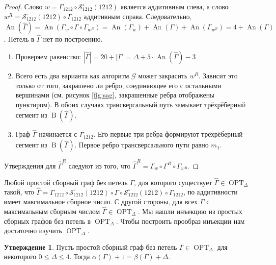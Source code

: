 \documentclass{article}
\theoremstyle{definition}
\newtheorem{conjecture}[theorem]{Утверждение}
\newcommand{\An}{\operatorname{An}}
\newcommand{\G}{\mathcal{G}}
\newcommand{\OPT}{\operatorname{OPT}}
\newcommand{\D}{\Delta}
\newcommand{\hGamma}{\hat{\Gamma}}
\newcommand{\B}{\operatorname{B}}
\begin{document}
\begin{proof}
    Слово $w = \Gamma_{1212} \circ \mathcal{S}_{1212}^\circ(1212)$ является аддитивным слева, а слово $w^R = \mathcal{S}_{1212}^\circ(1212) \circ \Gamma_{1212}$ аддитивным справа. Следовательно, $\An(\hGamma) = \An(\Gamma_w \circ \Gamma \circ \Gamma_{w^R}) = \An(\Gamma_w) + \An(\Gamma) + \An(\Gamma_{w^R}) = 4 + \An(\Gamma)$. Петель в $\hGamma$ нет по построению.
    
    \begin{enumerate}
        \item  Проверяем равенство: $|\hGamma| = 20 + |\Gamma| = \D+ 5 \cdot \An(\hGamma) - 3$
        \item  Всего есть два варианта как алгоритм $\G$ может закрасить $w^R$. Зависит это только от того, закрашено ли ребро, соединяющее его с остальными вершинами (см. рисунок \ref{fig:sag}, закрашенные ребра отображены пунктиром). В обоих случаях трансверсальный путь замыкает трёхрёберный сегмент из $\B(\hGamma)$.
        
        \item  Граф $\hGamma$ начинается с $\Gamma_{1212}$. Его первые три ребра формируют трёхрёберный сегмент из $\B(\hGamma)$. Первое ребро трансверсального пути равно $m_1$.
    \end{enumerate}

    Утверждения для $\hGamma^R$ следуют из того, что $\hGamma^R = \Gamma_w \circ \Gamma^R \circ \Gamma_{w^R}$.
\end{proof}

 Любой простой сборный граф без петель $\Gamma$, для которого существует $\hGamma \in \OPT_\D$ такой, что $\hGamma = \Gamma_{1212} \circ \mathcal{S}_{1212}^\circ(1212) \circ\Gamma \circ \mathcal{S}_{1212}^\circ(1212) \circ \Gamma_{1212}$, по аддитивности имеет максимальное сборное число. С другой стороны, для всех $\Gamma$ с максимальным сборным числом $\hGamma \in \OPT_\D$. Мы нашли инъекцию из простых сборных графов без петель в $\OPT_\D$. Чтобы построить прообраз инъекции нам достаточно изучить $\OPT_\D$.

 \begin{conjecture}
     Пусть простой сборный граф без петель $\Gamma \in \OPT_\D$ для некоторого $0 \leq \D \leq 4$. Тогда $\alpha(\Gamma) + 1 = \beta(\Gamma) + \D$.
 \end{conjecture}
\end{document}
